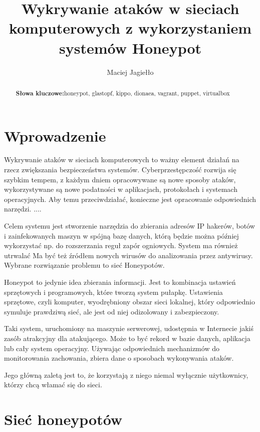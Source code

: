 \documentclass[runningheads,a4paper]{llncs}
\newcommand{\keywords}[1]{\par\addvspace\baselineskip
\noindent\keywordname\enspace\ignorespaces#1}
\renewcommand{\keywordname}{\textbf{Słowa kluczowe:}}
\begin{document}
\mainmatter
\title{Wykrywanie ataków w sieciach komputerowych z wykorzystaniem systemów Honeypot}
\author{Maciej Jagiełło}

\titlerunning{ }
\authorrunning{ }
\institute{}
\maketitle

\begin{abstract}

\keywords{honeypot, glastopf, kippo, dionaea, vagrant, puppet, virtualbox}
\end{abstract}


\section{Wprowadzenie}

Wykrywanie ataków w sieciach komputerowych to ważny element działań na rzecz zwiększania bezpieczeństwa systemów. Cyberprzestępczość rozwija się szybkim tempem, z każdym dniem opracowywane są nowe sposoby ataków, wykorzystywane są nowe podatności w aplikacjach, protokołach i systemach operacyjnych. Aby temu przeciwdziałać, konieczne jest opracowanie odpowiednich narzędzi. ....

Celem systemu jest stworzenie narzędzia do zbierania adresów IP hakerów, botów i zainfekowanych maszyn w spójną bazę danych, którą będzie można później wykorzystać np. do rozszerzania reguł zapór ogniowych. System ma również utrwalać Ma być też źródłem nowych wirusów do analizowania przez antywirusy. Wybrane rozwiązanie problemu to sieć Honeypotów.

Honeypot to jedynie idea zbierania informacji. Jest to kombinacja ustawień sprzętowych i programowych, które tworzą system pułapkę. Ustawienia sprzętowe, czyli komputer, wyodrębniony obszar sieci lokalnej, który odpowiednio symuluje prawdziwą sieć, ale jest od niej odizolowany i zabezpieczony.

Taki system, uruchomiony na maszynie serwerowej, udostępnia w Internecie jakiś zasób atrakcyjny dla atakującego. Może to być rekord w bazie danych, aplikacja lub cały system operacyjny. Używając odpowiednich mechanizmów do monitorowania zachowania, zbiera dane o sposobach wykonywania ataków.

Jego główną zaletą jest to, że korzystają z niego niemal wyłącznie użytkownicy, którzy chcą włamać się do sieci.

\section{Sieć honeypotów}
\end{document}
